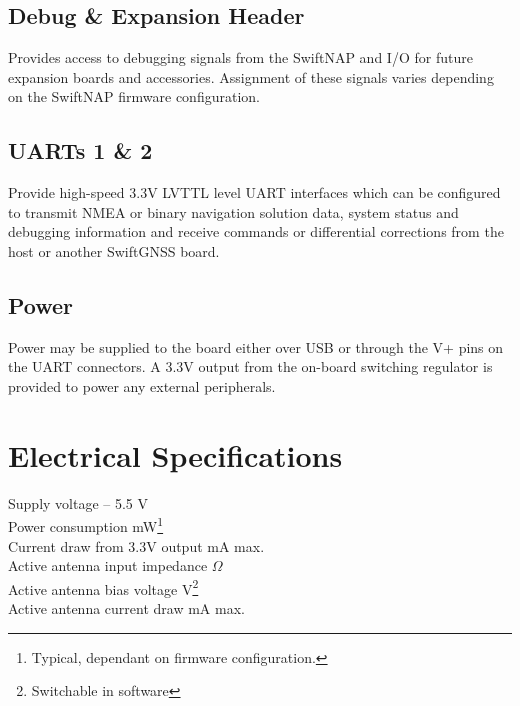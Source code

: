 \documentclass{article}
\newenvironment{mpar}{\par\noindent\minipage{\linewidth}}{\endminipage\par}
\begin{document}
\begin{multicols*}{2}
\subsection*{Debug \& Expansion Header}

Provides access to debugging signals from the SwiftNAP and I/O for future
expansion boards and accessories. Assignment of these signals varies depending
on the SwiftNAP firmware configuration.

\subsection*{UARTs 1 \& 2}

Provide high-speed 3.3V LVTTL level UART interfaces which can be configured to
transmit NMEA or binary navigation solution data, system status and debugging
information and receive commands or differential corrections from the host or
another SwiftGNSS board.

\subsection*{Power}

Power may be supplied to the board either over USB or through the V+ pins on the
UART connectors. A 3.3V output from the on-board switching regulator is
provided to power any external peripherals.

\end{multicols*}

\pagebreak

\section*{Electrical Specifications}

\begin{mpar}
\begin{multicols}{2}
  \noindent
  Supply voltage  -- 5.5 V \\
  Power consumption  mW\footnote{Typical, dependant on firmware configuration.} \\
  Current draw from 3.3V output  mA max.\\
  Active antenna input impedance  $\Omega$ \\
  Active antenna bias voltage  V\footnote{Switchable in software}\\
  Active antenna current draw  mA max.
\end{multicols}
\end{mpar}
\end{document}
